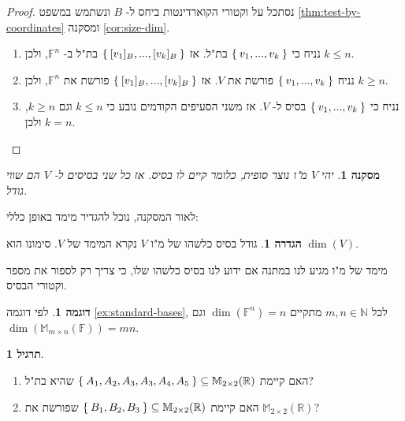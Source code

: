 \documentclass[12pt]{report}
\theoremstyle{plain}
\newtheorem{corollary}[theorem]{מסקנה}
\theoremstyle{definition}
\newtheorem{definition}[theorem]{הגדרה}
\newtheorem{example}{דוגמה}[chapter]
\newtheorem{exercise}{תרגיל}[chapter]
\newcommand{\R}{\mathbb{R}}
\newcommand{\N}{\mathbb{N}}
\newcommand{\F}{\mathbb{F}}
\newcommand{\M}{\mathbb{M}}
\newcommand{\0}{\mathbf{0}}
\begin{document}
\begin{proof}
נסתכל על וקטורי הקוארדינטות ביחס ל-
$B$
ונשתמש במשפט 
\ref{thm:test-by-coordinates}
ומסקנה
\ref{cor:size-dim}.
\begin{enumerate}[label=\alph*.]
\item 
נניח כי 
$\Set{v_1,...,v_k}$
בת"ל. אז
$\Set{[v_1]_B,...,[v_k]_B}$
בת"ל ב-
$\F^n$,
ולכן 
$k\leq n$.


\item
נניח
$\Set{v_1,...,v_k}$
פורשת את
$V$.
אז
$\Set{[v_1]_B,...,[v_k]_B}$
פורשת את
$\F^n$,
ולכן 
$k\geq n$.


\item 
נניח כי
$\Set{v_1,...,v_k}$
בסיס ל-
$V$.
אז משני הסעיפים הקודמים נובע כי
$k\leq n$
וגם 
$k\geq n$,
ולכן
$k=n$.


\end{enumerate}
\end{proof}

\begin{corollary}
יהי 
$V$
מ"ו נוצר סופית, כלומר קיים לו בסיס. אז כל שני בסיסים ל-
$V$
הם שווי גודל.
\end{corollary}

לאור המסקנה, נוכל להגדיר מימד באופן כללי:

\begin{definition}
גודל בסיס כלשהו של מ"ו
$V$
נקרא המימד של
$V$.
סימונו הוא
$\dim(V)$.
\end{definition}

מימד של מ"ו מגיע לנו במתנה אם ידוע לנו בסיס כלשהו שלו, כי צריך רק לספור את מספר וקטורי הבסיס.

\begin{example}
לפי דוגמה 
\ref{ex:standard-bases},
לכל
$m,n\in\N$
מתקיים
$\dim(\F^n)=n$
וגם
$\dim(\M_{m\times n}(\F))=mn$.

\end{example}

\begin{exercise}\
\begin{enumerate}[label=\alph*.]
\item
האם קיימת 
$\Set{A_1,A_2,A_3,A_3,A_4,A_5}\subseteq\M_{2\times 2}(\R)$
שהיא בת"ל?


\item
האם קיימת 
$\Set{B_1,B_2,B_3}\subseteq\M_{2\times 2}(\R)$
שפורשת את
$\M_{2\times 2}(\R)$?


\end{enumerate}
\end{exercise}
\end{document}
